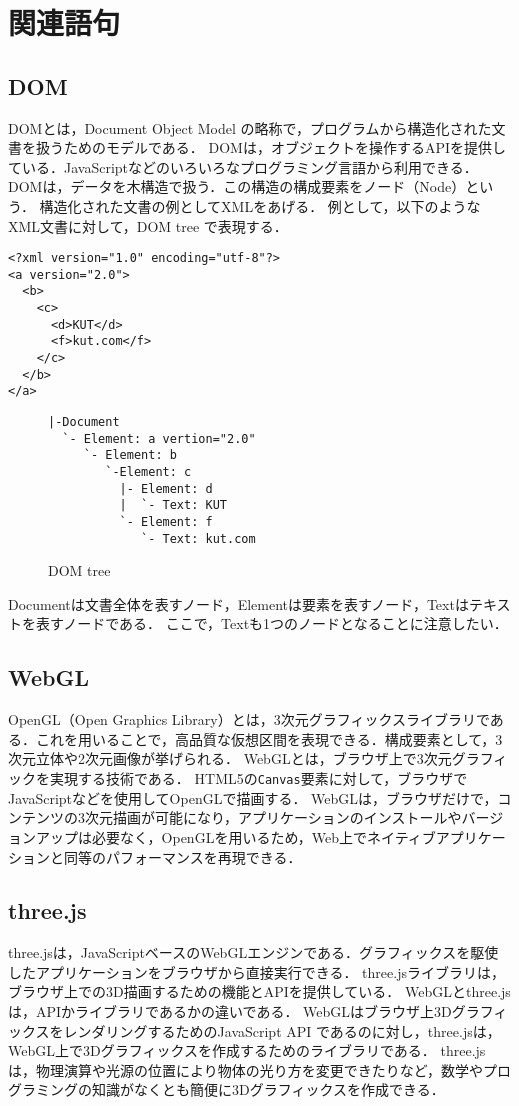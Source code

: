 \section{関連語句}
\subsection{DOM}
DOMとは，Document Object Model の略称で，プログラムから構造化された文書を扱うためのモデルである．
DOMは，オブジェクトを操作するAPIを提供している．JavaScriptなどのいろいろなプログラミング言語から利用できる．
DOMは，データを木構造で扱う．この構造の構成要素をノード（Node）という．
構造化された文書の例としてXMLをあげる．
例として，以下のようなXML文書に対して，DOM tree で表現する．
\begin{lstlisting}[caption={XML文書}]
<?xml version="1.0" encoding="utf-8"?>
<a version="2.0">
  <b>
    <c>
      <d>KUT</d>
      <f>kut.com</f>
    </c>
  </b>
</a>
\end{lstlisting}
\begin{figure}[H]
    \begin{framed}
        \centering
        \begin{verbatim}
|-Document
  `- Element: a vertion="2.0"
     `- Element: b
        `-Element: c
          |- Element: d
          |  `- Text: KUT
          `- Element: f   
             `- Text: kut.com
\end{verbatim}
    \end{framed}
    \caption{DOM tree}
\end{figure}
Documentは文書全体を表すノード，Elementは要素を表すノード，Textはテキストを表すノードである．
ここで，Textも1つのノードとなることに注意したい．
\\\hfill\cite{XML文書とDOM}
\subsection{WebGL}
OpenGL（Open Graphics Library）とは，3次元グラフィックスライブラリである．これを用いることで，高品質な仮想区間を表現できる．構成要素として，3次元立体や2次元画像が挙げられる\cite{OpenGL入門}．
WebGLとは，ブラウザ上で3次元グラフィックを実現する技術である．
HTML5の\texttt{Canvas}要素に対して，ブラウザでJavaScriptなどを使用してOpenGLで描画する．
WebGLは，ブラウザだけで，コンテンツの3次元描画が可能になり，アプリケーションのインストールやバージョンアップは必要なく，OpenGLを用いるため，Web上でネイティブアプリケーションと同等のパフォーマンスを再現できる．
\\\hfill\cite{webglみずほ}
\subsection{three.js}
three.jsは，JavaScriptベースのWebGLエンジンである．グラフィックスを駆使したアプリケーションをブラウザから直接実行できる．
three.jsライブラリは，ブラウザ上での3D描画するための機能とAPIを提供している．
WebGLとthree.jsは，APIかライブラリであるかの違いである．
WebGLはブラウザ上3DグラフィックスをレンダリングするためのJavaScript API であるのに対し，three.jsは，WebGL上で3Dグラフィックスを作成するためのライブラリである．
three.jsは，物理演算や光源の位置により物体の光り方を変更できたりなど，数学やプログラミングの知識がなくとも簡便に3Dグラフィックスを作成できる．
\\\hfill\cite{three.js}